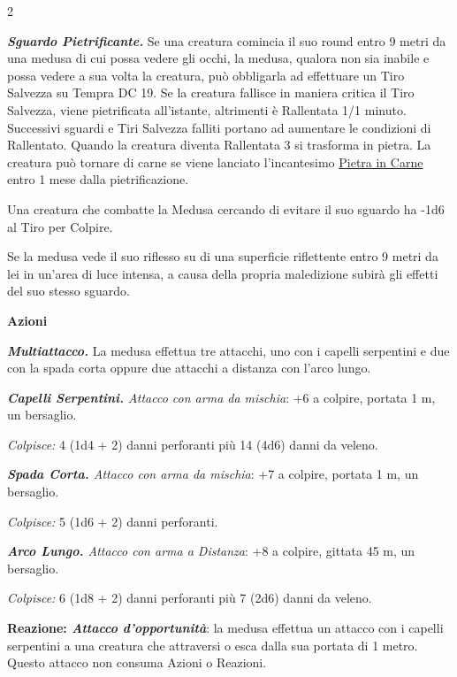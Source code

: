 \begin{multicols}{2}
{\emph{\textbf{Sguardo Pietrificante.}} Se una creatura comincia il suo round entro 9 metri da una medusa di cui possa vedere gli occhi, la medusa, qualora non sia inabile e possa vedere a sua volta la creatura, può obbligarla ad effettuare un Tiro Salvezza su Tempra DC 19. Se la creatura fallisce in maniera critica il Tiro Salvezza, viene pietrificata all'istante, altrimenti è Rallentata 1/1 minuto. Successivi sguardi e Tiri Salvezza falliti portano ad aumentare le condizioni di Rallentato. Quando la creatura diventa Rallentata 3 si trasforma in pietra. La creatura può tornare di carne se viene lanciato l'incantesimo \hyperlink{Pietra in Carne}{Pietra in Carne} entro 1 mese dalla pietrificazione.

Una creatura che combatte la Medusa cercando di evitare il suo sguardo ha -1d6 al Tiro per Colpire.

Se la medusa vede il suo riflesso su di una superficie riflettente entro 9 metri da lei in un'area di luce intensa, a causa della propria maledizione subirà gli effetti del suo stesso sguardo.

\textbf{Azioni}

\emph{\textbf{Multiattacco.}} La medusa effettua tre attacchi, uno con i capelli serpentini e due con la spada corta oppure due attacchi a distanza con l'arco lungo.

\emph{\textbf{Capelli Serpentini.} Attacco con arma da mischia}: +6 a colpire, portata 1 m, un bersaglio.

\emph{Colpisce:} 4 (1d4 + 2) danni perforanti più 14 (4d6) danni da veleno.

\emph{\textbf{Spada Corta.} Attacco con arma da mischia}: +7 a colpire, portata 1 m, un bersaglio.

\emph{Colpisce:} 5 (1d6 + 2) danni perforanti.

\emph{\textbf{Arco Lungo.} Attacco con arma a Distanza}: +8 a colpire, gittata 45 m, un bersaglio.

\emph{Colpisce:} 6 (1d8 + 2) danni perforanti più 7 (2d6) danni da veleno.

\textbf{Reazione: \emph{Attacco d'opportunità}}: la medusa effettua un attacco con i capelli serpentini a una creatura che attraversi o esca dalla sua portata di 1 metro. Questo attacco non consuma Azioni o Reazioni.

}
\end{multicols}
